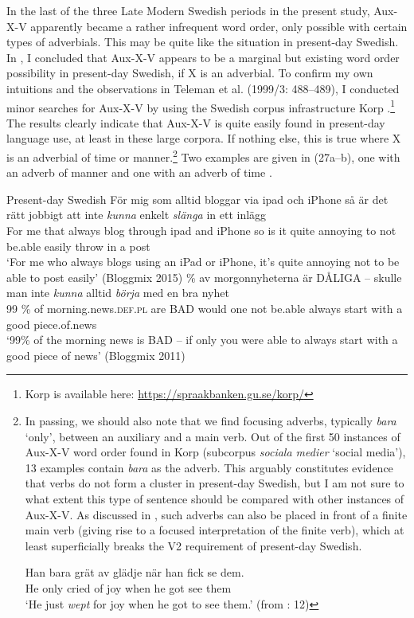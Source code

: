 \documentclass[output=paper, colorlinks, citecolor=brown]{langscibook}
\begin{document}
In the last of the three Late Modern Swedish periods in the present study, Aux-X-V apparently became a rather infrequent word order, only possible with certain types of adverbials. This may be quite like the situation in present-day Swedish. In , I concluded that Aux-X-V appears to be a marginal but existing word order possibility in present-day Swedish, if X is an adverbial. To confirm my own intuitions and the observations in Teleman et al. (1999/3: 488–489), I conducted minor searches for Aux-X-V by using the Swedish corpus infrastructure Korp \citep{BorinEtAl2012}.\footnote{Korp is available here: \url{https://spraakbanken.gu.se/korp/}}  The results clearly indicate that Aux-X-V is quite easily found in present-day language use, at least in these large corpora. If nothing else, this is true where X is an adverbial of time or manner.{\footnote{In passing, we should also note that we find focusing adverbs, typically \textit{bara} ‘only’, between an auxiliary and a main verb. Out of the first 50 instances of Aux-X-V word order found in Korp (subcorpus \textit{sociala medier} ‘social media’), 13 examples contain \textit{bara} as the adverb. This arguably constitutes evidence that verbs do not form a cluster in present-day Swedish, but I am not sure to what extent this type of sentence should be compared with other instances of Aux-X-V. As discussed in \citet{BrandtlerHakansson2017}, such adverbs can also be placed in front of a finite main verb (giving rise to a focused interpretation of the finite verb), which at least superficially breaks the V2 requirement of present-day Swedish.   

\ea
\gll  Han  bara  grät  av  glädje  när  han  fick  se  dem.\\
      He  only  cried  of  joy  when  he  got  see  them\\
\glt ‘He just \textit{wept} for joy when he got to see them.’ (from \citealt{BrandtlerHakansson2017}: 12)
\z}} Two examples are given in (27a–b), one with an adverb of manner  and one with an adverb of time .


\ea Present-day Swedish\label{ex:sangfelt:27}
\ea\label{ex:sangfelt:27a}
\gll För mig som alltid bloggar via ipad och iPhone så är det rätt jobbigt att inte \textit{kunna} {enkelt} \textit{slänga} in ett inlägg\\
 For me that always blog through ipad and iPhone so is it quite annoying to not be.able easily throw in a post\\
\glt ‘For me who always blogs using an iPad or iPhone, it’s quite annoying not to be able to post easily’ (Bloggmix 2015)
\ex \label{ex:sangfelt:27b} \% av morgonnyheterna är DÅLIGA – skulle man inte \textit{kunna} {alltid} \textit{börja} med en bra nyhet \\
                                99 \% of morning.news.\textsc{def.pl} are BAD {} would one not be.able always start with a good piece.of.news \\
\glt ‘99\% of the morning news is BAD – if only you were able to always start with a good piece of news’ (Bloggmix 2011)\\
\z 
\z 
\end{document}
